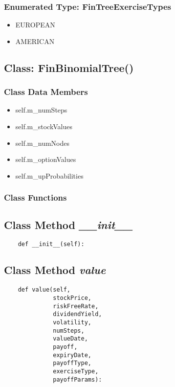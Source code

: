 \documentclass[twoside,11pt]{book}
\begin{document}
\subsubsection{Enumerated Type: FinTreeExerciseTypes}
\begin{itemize}
\item{EUROPEAN}
\item{AMERICAN}
\end{itemize}

\subsection{Class: FinBinomialTree()}


\subsubsection{Class Data Members}
\begin{itemize}
\item{self.m\_numSteps}
\item{self.m\_stockValues}
\item{self.m\_numNodes}
\item{self.m\_optionValues}
\item{self.m\_upProbabilities}
\end{itemize}

\subsubsection{Class Functions}

\subsection{Class Method {\it \_\_init\_\_}}


\begin{lstlisting}
    def __init__(self):
\end{lstlisting}

\subsection{Class Method {\it value}}


\begin{lstlisting}
    def value(self,
              stockPrice,
              riskFreeRate,
              dividendYield,
              volatility,
              numSteps,
              valueDate,
              payoff,
              expiryDate,
              payoffType,
              exerciseType,
              payoffParams):
\end{lstlisting}
\end{document}
